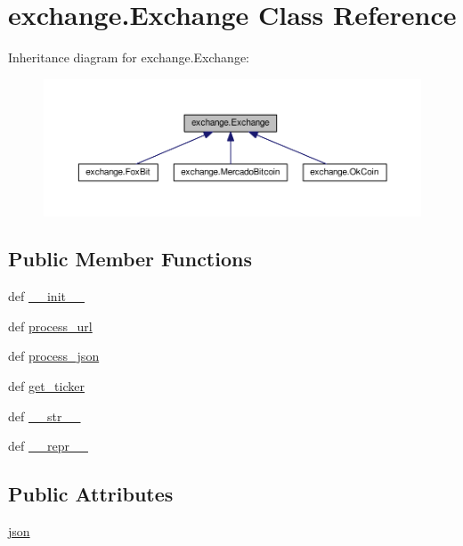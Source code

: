 \hypertarget{classexchange_1_1_exchange}{\section{exchange.\-Exchange Class Reference}
\label{classexchange_1_1_exchange}
}


Inheritance diagram for exchange.\-Exchange\-:
\nopagebreak
\begin{figure}[H]
\begin{center}
\leavevmode
\includegraphics[width=350pt]{classexchange_1_1_exchange__inherit__graph}
\end{center}
\end{figure}
\subsection*{Public Member Functions}
\begin{DoxyCompactItemize}
\item 
def \hyperlink{classexchange_1_1_exchange_a75e4957e085558959dc606fcc7cca55d}{\-\_\-\-\_\-init\-\_\-\-\_\-}
\item 
def \hyperlink{classexchange_1_1_exchange_ad475e9251f614da675eb76d89a649dcf}{process\-\_\-url}
\item 
def \hyperlink{classexchange_1_1_exchange_a8d8b333b89276d19200710edecad8daf}{process\-\_\-json}
\item 
def \hyperlink{classexchange_1_1_exchange_acd7e3233946da3b9d452f9505cd58033}{get\-\_\-ticker}
\item 
def \hyperlink{classexchange_1_1_exchange_a24c728f6cb4700a285bae3cf902580ee}{\-\_\-\-\_\-str\-\_\-\-\_\-}
\item 
def \hyperlink{classexchange_1_1_exchange_a0ad3ad8c4feaabd714bd93ad5c7e9ffd}{\-\_\-\-\_\-repr\-\_\-\-\_\-}
\end{DoxyCompactItemize}
\subsection*{Public Attributes}
\begin{DoxyCompactItemize}
\item 
\hyperlink{classexchange_1_1_exchange_a6ce8e0779d98031b1cd9200d2a0fa5ad}{json}
\end{DoxyCompactItemize}
